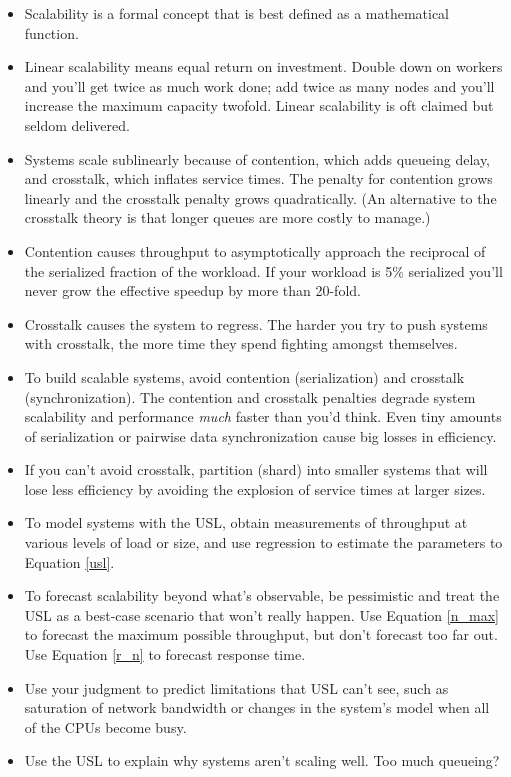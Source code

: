 \documentclass{vivid_layout}
\begin{document}
\begin{itemize}
\item Scalability is a formal concept that is best defined as a mathematical
function.
\item Linear scalability means equal return on investment. Double down on
workers and you'll get twice as much work done; add twice as many nodes and
you'll increase the maximum capacity twofold. Linear scalability is oft claimed
but seldom delivered.
\item Systems scale sublinearly because of contention, which adds queueing
delay, and crosstalk, which inflates service times. The penalty for contention
grows linearly and the crosstalk penalty grows quadratically. (An alternative
to the crosstalk theory is that longer queues are more costly to manage.)
\item Contention causes throughput to asymptotically approach the
reciprocal of the serialized fraction of the workload. If your workload is 5\%
serialized you'll never grow the effective speedup by more than 20-fold.
\item Crosstalk causes the system to regress. The harder you try to push systems
with crosstalk, the more time they spend fighting amongst themselves.
\item To build scalable systems, avoid contention (serialization) and crosstalk
(synchronization).
The contention and crosstalk penalties degrade system scalability and
performance {\itshape much} faster than you'd think. Even tiny amounts of
serialization or pairwise data synchronization cause big losses in efficiency.
\item If you can't avoid crosstalk, partition (shard) into smaller systems that will
lose less efficiency by avoiding the explosion of service times at larger sizes.
\item To model systems with the USL, obtain measurements of throughput at
various levels of load or size, and use regression to estimate the parameters to
Equation \ref{usl}.
\item To forecast scalability beyond what's observable, be pessimistic and treat
the USL as a best-case scenario that won't really happen. Use Equation
\ref{n_max} to forecast the maximum possible throughput, but don't forecast too
far out. Use Equation \ref{r_n} to forecast response time.
\item Use your judgment to predict limitations that USL can't see, such as
saturation of network bandwidth or changes in the system's model when all of the
CPUs become busy.
\item Use the USL to explain why systems aren't scaling well. Too much queueing?

\end{itemize}
\end{document}
